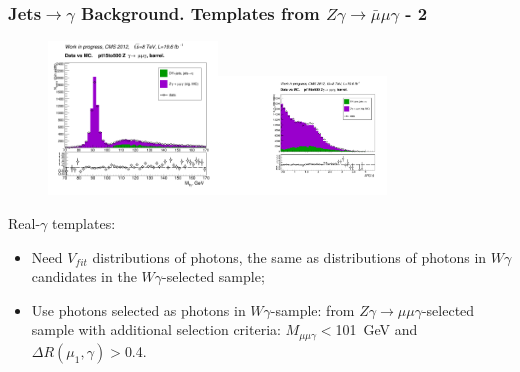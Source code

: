 \begin{frame}\frametitle{Jets$\rightarrow \gamma$ Background. Templates from $Z\gamma\rightarrow{\bar{\mu}}\mu\gamma$ - 2}

  \begin{figure}[htb]
    \begin{center}
       \includegraphics[width=0.40\textwidth]{../figs/figs_v11/MUON_ZGamma/PrepareYields/c_TotalDATAvsMC_Barrel__MpholeplepVERY_PRELIMINARY_pt15to500_.png}\includegraphics[width=0.40\textwidth]{../figs/figs_v11/MUON_ZGamma/PrepareYields/c_TotalDATAvsMC_Barrel__lep1PhoDeltaRVERY_PRELIMINARY_pt15to500_.pdf}\\
    \end{center}
  \end{figure}
\scriptsize

Real-$\gamma$ templates:
  \begin{itemize}
    \tiny
    \item Need $V_{fit}$ distributions of photons, the same as distributions of photons in $W\gamma$ candidates in the $W\gamma$-selected sample;
    \item Use photons selected as photons in $W\gamma$-sample: from $Z\gamma \rightarrow \mu\mu\gamma$-selected sample with additional selection criteria: $M_{\mu\mu\gamma}<$101~GeV and $\Delta R(\mu_{1},\gamma)>$0.4.
  \end{itemize}


\end{frame}
